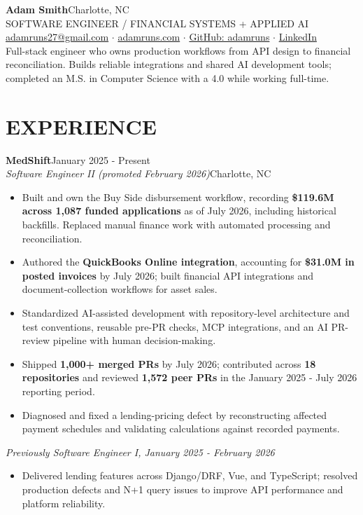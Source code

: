 \documentclass[10pt,letterpaper]{article}
\newcommand{\role}[4]{\vspace{5pt}\textbf{#1}\hfill{\small #2}\\\textit{#3}\hfill{\small\color{muted}#4}}
\begin{document}
{\huge\bfseries Adam Smith}\hfill{\small Charlotte, NC}\\[4pt]
{\small\color{accent} SOFTWARE ENGINEER \enspace / \enspace FINANCIAL SYSTEMS \enspace + \enspace APPLIED AI}\\[6pt]
{\small \href{mailto:adamruns27@gmail.com}{adamruns27@gmail.com} \enspace$\cdot$\enspace
\href{https://adamruns.com}{adamruns.com} \enspace$\cdot$\enspace
\href{https://github.com/adamruns}{GitHub: adamruns} \enspace$\cdot$\enspace
\href{https://www.linkedin.com/in/adam-robert-smith/}{LinkedIn}}\\[8pt]
Full-stack engineer who owns production workflows from API design to financial reconciliation. Builds reliable integrations and shared AI development tools; completed an M.S. in Computer Science with a 4.0 while working full-time.
\section*{EXPERIENCE}
\role{MedShift}{January 2025 - Present}{Software Engineer II (promoted February 2026)}{Charlotte, NC}
\begin{itemize}
\item Built and own the Buy Side disbursement workflow, recording \textbf{\$119.6M across 1,087 funded applications} as of July 2026, including historical backfills. Replaced manual finance work with automated processing and reconciliation.
\item Authored the \textbf{QuickBooks Online integration}, accounting for \textbf{\$31.0M in posted invoices} by July 2026; built financial API integrations and document-collection workflows for asset sales.
\item Standardized AI-assisted development with repository-level architecture and test conventions, reusable pre-PR checks, MCP integrations, and an AI PR-review pipeline with human decision-making.
\item Shipped \textbf{1,000+ merged PRs} by July 2026; contributed across \textbf{18 repositories} and reviewed \textbf{1,572 peer PRs} in the January 2025 - July 2026 reporting period.
\item Diagnosed and fixed a lending-pricing defect by reconstructing affected payment schedules and validating calculations against recorded payments.
\end{itemize}
{\small\textit{Previously Software Engineer I, January 2025 - February 2026}}
\begin{itemize}
\item Delivered lending features across Django/DRF, Vue, and TypeScript; resolved production defects and N+1 query issues to improve API performance and platform reliability.
\end{itemize}
\end{document}

